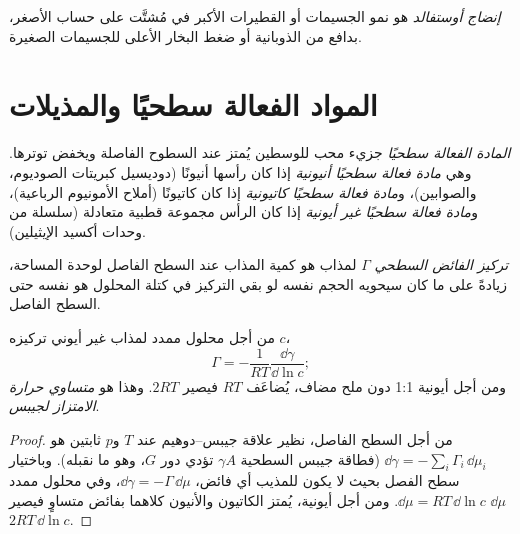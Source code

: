 \begin{definition}\label{def:b3:colloids:ripening}
\emph{إنضاج أوستفالد} هو نمو الجسيمات أو القطيرات
الأكبر في مُشتَّت على حساب الأصغر،
بدافع من الذوبانية أو ضغط البخار الأعلى للجسيمات الصغيرة.
\end{definition}

\section{المواد الفعالة سطحيًا والمذيلات}

\begin{definition}\label{def:b3:colloids:surfactant}
\emph{المادة الفعالة سطحيًا} جزيء محب للوسطين
يُمتز عند السطوح الفاصلة ويخفض توترها. وهي
\emph{مادة فعالة سطحيًا أنيونية} إذا كان رأسها أنيونًا (دوديسيل كبريتات
الصوديوم، والصوابين)، و\emph{مادة فعالة سطحيًا كاتيونية}
إذا كان كاتيونًا (أملاح الأمونيوم الرباعية)، و\emph{مادة فعالة سطحيًا غير
أيونية} إذا كان الرأس مجموعة قطبية متعادلة (سلسلة
من وحدات أكسيد الإيثيلين).
\end{definition}

\begin{definition}\label{def:b3:colloids:surface-excess}
\emph{تركيز الفائض السطحي} $\Gamma$ لمذاب
هو كمية المذاب عند السطح الفاصل لوحدة المساحة، زيادةً على
ما كان سيحويه الحجم نفسه لو بقي التركيز في كتلة المحلول هو نفسه حتى
السطح الفاصل.
\end{definition}

\begin{theorem}\label{thm:b3:colloids:gibbs-adsorption}
من أجل محلول ممدد لمذاب غير أيوني تركيزه $c$،
\[
  \Gamma = -\frac{1}{RT}\frac{\dd\gamma}{\dd\ln c};
\]
ومن أجل  أيونية 1:1 دون ملح مضاف، يُضاعَف $RT$ فيصير $2RT$. وهذا هو
\emph{متساوي حرارة الامتزاز لجيبس}.
\end{theorem}

\begin{proof}
من أجل السطح الفاصل، نظير علاقة جيبس--دوهيم عند $T$ 
و$p$ ثابتين هو $\dd\gamma = -\sum_i\Gamma_i\,\dd\mu_i$ (فطاقة جيبس السطحية $\gamma A$ تؤدي دور $G$،
وهو ما نقبله). وباختيار سطح الفصل بحيث لا يكون للمذيب أي فائض،
$\dd\gamma = -\Gamma\,\dd\mu$، وفي محلول ممدد $\dd\mu = RT\,\dd\ln c$. ومن أجل  أيونية،
يُمتز الكاتيون والأنيون كلاهما بفائض متساوٍ فيصير $\dd\mu$
$2RT\,\dd\ln c$.
\end{proof}

